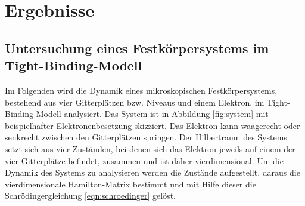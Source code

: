 \chapter{Ergebnisse}

\section{Untersuchung eines Festkörpersystems im Tight-Binding-Modell}

Im Folgenden wird die Dynamik eines mikroskopischen Festkörpersystems, bestehend aus vier Gitterplätzen bzw. Niveaus und einem Elektron, im Tight-Binding-Modell analysiert.
Das System ist in Abbildung \ref{fig:system} mit beispielhafter Elektronenbesetzung skizziert. Das Elektron kann waagerecht oder senkrecht zwischen den Gitterplätzen springen.
Der Hilbertraum des Systems setzt sich aus vier Zuständen, bei denen sich das Elektron jeweils auf einem der vier Gitterplätze befindet, zusammen und ist daher vierdimensional.
Um die Dynamik des Systems zu analysieren werden die Zustände aufgestellt, daraus die vierdimensionale Hamilton-Matrix bestimmt und mit Hilfe dieser die Schrödingergleichung \ref{eqn:schroedinger} gelöst.

